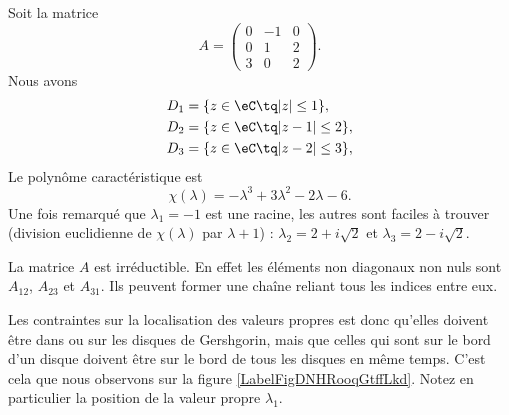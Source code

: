 \begin{example}     \label{EXooDQYDooPxqHjZ}
    Soit la matrice
    \begin{equation}
        A=\begin{pmatrix}
            0    &   -1    &   0    \\
            0    &   1    &   2    \\
            3    &   0    &   2
        \end{pmatrix}.
    \end{equation}
    Nous avons
    \begin{subequations}
        \begin{align}
            D_1&=\{ z\in \eC\tq | z |\leq 1 \},\\
            D_2&=\{ z\in \eC\tq | z-1 |\leq 2 \},\\
            D_3&=\{ z\in \eC\tq | z-2 |\leq 3 \},
        \end{align}
    \end{subequations}
    Le polynôme caractéristique est
    \begin{equation}
        \chi(\lambda)=-\lambda^3+3\lambda^2-2\lambda-6.
    \end{equation}
    Une fois remarqué que \( \lambda_1=-1\) est une racine, les autres sont faciles à trouver (division euclidienne de \( \chi(\lambda)\) par \( \lambda+1\)) : \( \lambda_2=2+i\sqrt{2}\) et \( \lambda_3=2-i\sqrt{ 2 }\).

    La matrice \( A\) est irréductible. En effet les éléments non diagonaux non nuls sont \( A_{12}\), \( A_{23}\) et \( A_{31}\). Ils peuvent former une chaîne reliant tous les indices entre eux. 

    Les contraintes sur la localisation des valeurs propres est donc qu'elles doivent être dans ou sur les disques de Gershgorin, mais que celles qui sont sur le bord d'un disque doivent être sur le bord de tous les disques en même temps. C'est cela que nous observons sur la figure \ref{LabelFigDNHRooqGtffLkd}. Notez en particulier la position de la valeur propre \( \lambda_1\).


    \newcommand{\CaptionFigDNHRooqGtffLkd}{Les disques de Gershgorin et les valeurs propres pour l'exemple \ref{EXooDQYDooPxqHjZ}.}
   

\end{example}

